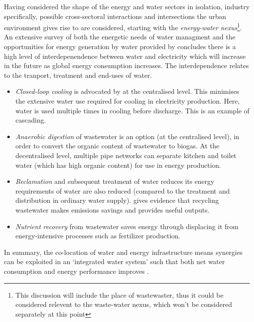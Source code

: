 Having considered the shape of the energy and water sectors in isolation, industry specifically, possible cross-sectoral interactions and intersections the urban environment gives rise to are considered, starting with the \emph{energy-water nexus}\footnote{This discussion will include the place of wastewaster, thus it could be considered relevent to the waste-water nexus, which won't be considered separately at this point}. An extensive survey of both the energetic needs of water managment and the opportunities for energy generation by water provided by \citep{McMahon2011} concludes there is a high level of interdepenendence between water and electricity which will increase in the future as global energy consumption increases. The interdependence relates to the tranport, treatment and end-uses of water.
\begin{itemize}
	\item \emph{Closed-loop cooling} is advocated by \citet{McMahon2011} at the centralised level. This minimises the extensive water use required for cooling in electricity production. Here, water is used multiple times in cooling before discharge. This is an example of cascading.
	\item \emph{Anaerobic digestion} of wastewater is an option (at the centralised level), in order to convert the organic content of wastewater to biogas. At the decentralised level, multiple pipe networks can separate kitchen and toilet water (which has high organic content) for use in energy production.
	\item \emph{Reclamation} and subsequent treatment of water reduces its energy requirements of water are also reduced (compared to the treatment and distribution in ordinary water supply). \citep{Lundin2000} gives evidence that recycling wastewater makes emissions savings and provides useful outputs.
	\item \emph{Nutrient recovery} from wastewater saves energy through displacing it from  energy-intensive processes such as fertilizer production. 
\end{itemize}
In summary, the co-location of water and energy infrastructure means synergies can be exploited in an `integrated water system' such that both net water consumption and energy performance improves \citep{Makropoulos2008}.

